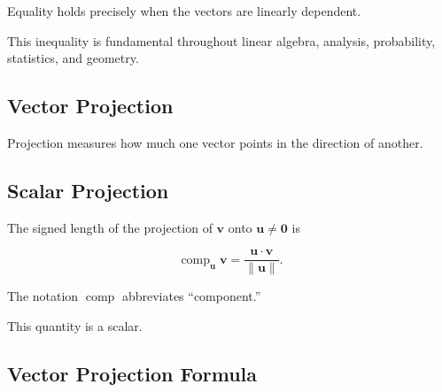 Equality holds precisely when the vectors are linearly dependent.

This inequality is fundamental throughout linear algebra, analysis,
probability, statistics, and geometry.

\subsection{Vector Projection}
\label{subsec:vector-projection}

Projection measures how much one vector points in the direction of another.

\begin{centereddiagram}
\end{centereddiagram}

\subsection{Scalar Projection}
\label{subsec:scalar-projection}

The signed length of the projection of \(\mathbf{v}\) onto
\(\mathbf{u}\neq\mathbf{0}\) is

\[
\boxed{
\operatorname{comp}_{\mathbf{u}}\mathbf{v}
=
\frac{\mathbf{u}\cdot\mathbf{v}}{\|\mathbf{u}\|}.
}
\]

The notation \(\operatorname{comp}\) abbreviates ``component.''

This quantity is a scalar.

\subsection{Vector Projection Formula}
\label{subsec:vector-projection-formula}

